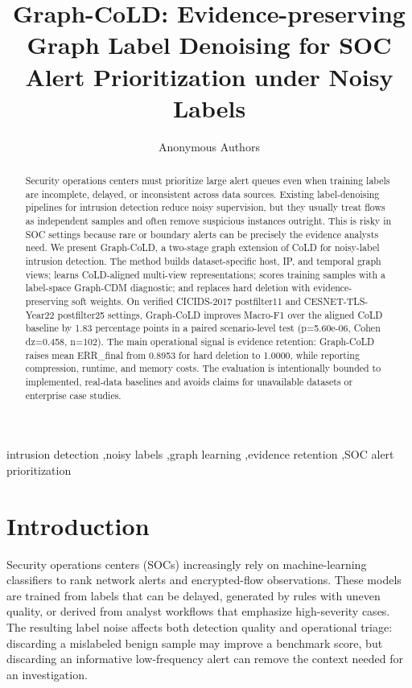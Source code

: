 \documentclass[preprint,review,12pt]{elsarticle}
\title{Graph-CoLD: Evidence-preserving Graph Label Denoising for SOC Alert Prioritization under Noisy Labels}
\author{Anonymous Authors}
\begin{document}
\begin{frontmatter}
\maketitle
\begin{abstract}
Security operations centers must prioritize large alert queues even when training
labels are incomplete, delayed, or inconsistent across data sources. Existing
label-denoising pipelines for intrusion detection reduce noisy supervision, but
they usually treat flows as independent samples and often remove suspicious
instances outright. This is risky in SOC settings because rare or boundary
alerts can be precisely the evidence analysts need. We present Graph-CoLD, a
two-stage graph extension of CoLD for noisy-label intrusion detection. The method
builds dataset-specific host, IP, and temporal graph views; learns CoLD-aligned
multi-view representations; scores training samples with a label-space
Graph-CDM diagnostic; and replaces hard deletion with evidence-preserving soft
weights. On verified CICIDS-2017 postfilter11 and CESNET-TLS-Year22 postfilter25
settings, Graph-CoLD improves Macro-F1 over the aligned CoLD baseline by
1.83 percentage points in a paired scenario-level test
(p=5.60e-06, Cohen dz=0.458,
n=102). The main operational signal is evidence retention:
Graph-CoLD raises mean ERR\_final from 0.8953 for hard
deletion to 1.0000, while reporting compression, runtime,
and memory costs. The evaluation is intentionally bounded to implemented,
real-data baselines and avoids claims for unavailable datasets or enterprise
case studies.
\end{abstract}
\begin{keyword}
intrusion detection \sep noisy labels \sep graph learning \sep evidence retention \sep SOC alert prioritization
\end{keyword}
\end{frontmatter}

\section{Introduction}
Security operations centers (SOCs) increasingly rely on machine-learning
classifiers to rank network alerts and encrypted-flow observations. These models
are trained from labels that can be delayed, generated by rules with uneven
quality, or derived from analyst workflows that emphasize high-severity cases.
The resulting label noise affects both detection quality and operational triage:
discarding a mislabeled benign sample may improve a benchmark score, but
discarding an informative low-frequency alert can remove the context needed for
an investigation.
\end{document}
